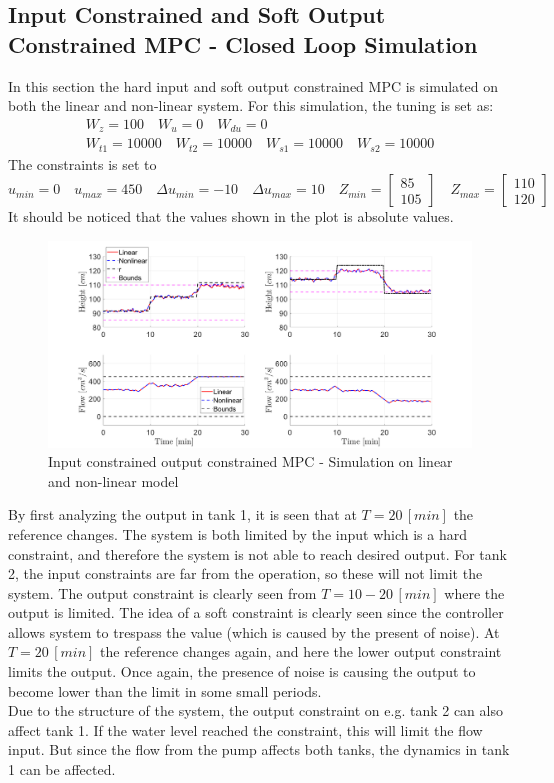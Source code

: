 \subsection{Input Constrained and Soft Output Constrained MPC - Closed Loop Simulation}
In this section the hard input and soft output constrained MPC is simulated on both the linear and non-linear system. For this simulation, the tuning is set as:
\begin{equation}
    \begin{gathered}
        W_z=100 \quad W_u=0 \quad W_{du}=0\\
        W_{t1}=10000 \quad W_{t2}=10000 \quad W_{s1}=10000 \quad W_{s2}=10000
    \end{gathered}
\end{equation}
The constraints is set to 
\begin{equation}
    u_{min}=0\quad u_{max}=450\quad \Delta u_{min}=-10\quad \Delta u_{max}=10 \quad Z_{min} = \begin{bmatrix} 85 \\ 105 \end{bmatrix} \quad Z_{max} = \begin{bmatrix} 110 \\ 120 \end{bmatrix}
\end{equation}
It should be noticed that the values shown in the plot is absolute values.
\begin{figure}[H]
    \centering
    \includegraphics[width=1\textwidth]{Figures/Pr10.3_InOut_con_MPC.png}
    \caption{Input constrained output constrained MPC - Simulation on linear and non-linear model}
\end{figure}
By first analyzing the output in tank 1, it is seen that at $T=20\,[min]$ the reference changes. The system is both limited by the input which is a hard constraint, and therefore the system is not able to reach desired output. For tank 2, the input constraints are far from the operation, so these will not limit the system. The output constraint is clearly seen from $T=10-20\,[min]$ where the output is limited. The idea of a soft constraint is clearly seen since the controller allows system to trespass the value (which is caused by the present of noise). At $T=20\,[min]$ the reference changes again, and here the lower output constraint limits the output. Once again, the presence of noise is causing the output to become lower than the limit in some small periods. \\
Due to the structure of the system, the output constraint on e.g. tank 2 can also affect tank 1. If the water level reached the constraint, this will limit the flow input. But since the flow from the pump affects both tanks, the dynamics in tank 1 can be affected.